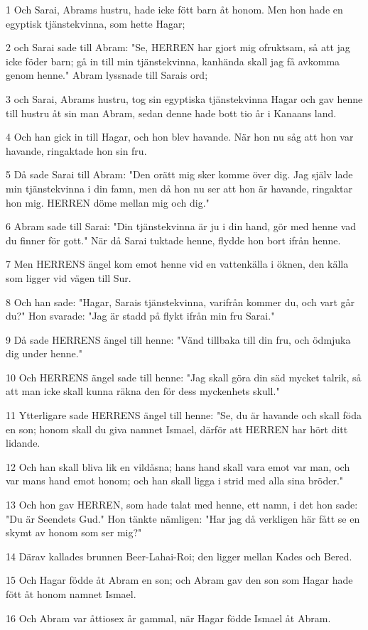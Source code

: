 \par 1 Och Sarai, Abrams hustru, hade icke fött barn åt honom. Men hon hade en egyptisk tjänstekvinna, som hette Hagar;
\par 2 och Sarai sade till Abram: "Se, HERREN har gjort mig ofruktsam, så att jag icke föder barn; gå in till min tjänstekvinna, kanhända skall jag få avkomma genom henne." Abram lyssnade till Sarais ord;
\par 3 och Sarai, Abrams hustru, tog sin egyptiska tjänstekvinna Hagar och gav henne till hustru åt sin man Abram, sedan denne hade bott tio år i Kanaans land.
\par 4 Och han gick in till Hagar, och hon blev havande. När hon nu såg att hon var havande, ringaktade hon sin fru.
\par 5 Då sade Sarai till Abram: "Den orätt mig sker komme över dig. Jag själv lade min tjänstekvinna i din famn, men då hon nu ser att hon är havande, ringaktar hon mig. HERREN döme mellan mig och dig."
\par 6 Abram sade till Sarai: "Din tjänstekvinna är ju i din hand, gör med henne vad du finner för gott." När då Sarai tuktade henne, flydde hon bort ifrån henne.
\par 7 Men HERRENS ängel kom emot henne vid en vattenkälla i öknen, den källa som ligger vid vägen till Sur.
\par 8 Och han sade: "Hagar, Sarais tjänstekvinna, varifrån kommer du, och vart går du?" Hon svarade: "Jag är stadd på flykt ifrån min fru Sarai."
\par 9 Då sade HERRENS ängel till henne: "Vänd tillbaka till din fru, och ödmjuka dig under henne."
\par 10 Och HERRENS ängel sade till henne: "Jag skall göra din säd mycket talrik, så att man icke skall kunna räkna den för dess myckenhets skull."
\par 11 Ytterligare sade HERRENS ängel till henne: "Se, du är havande och skall föda en son; honom skall du giva namnet Ismael, därför att HERREN har hört ditt lidande.
\par 12 Och han skall bliva lik en vildåsna; hans hand skall vara emot var man, och var mans hand emot honom; och han skall ligga i strid med alla sina bröder."
\par 13 Och hon gav HERREN, som hade talat med henne, ett namn, i det hon sade: "Du är Seendets Gud." Hon tänkte nämligen: "Har jag då verkligen här fått se en skymt av honom som ser mig?"
\par 14 Därav kallades brunnen Beer-Lahai-Roi; den ligger mellan Kades och Bered.
\par 15 Och Hagar födde åt Abram en son; och Abram gav den son som Hagar hade fött åt honom namnet Ismael.
\par 16 Och Abram var åttiosex år gammal, när Hagar födde Ismael åt Abram.


